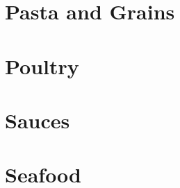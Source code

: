 \documentclass{report}
\begin{document}
    \chapter{Pasta and Grains}

    
    
    
    
    
    
    
    
    
    
    
    
    

    \chapter{Poultry}

    
    
    
    
    
    
    

    \chapter{Sauces}
    
    
    

    \chapter{Seafood}

    
    
    
    
    
    
    
    

\end{document}
